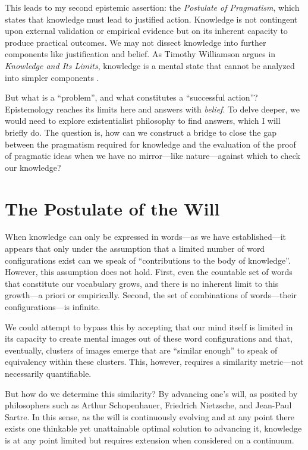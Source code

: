 This leads to my second epistemic assertion: the \textit{Postulate of Pragmatism}, which states that knowledge must lead to justified action. Knowledge is not contingent upon external validation or empirical evidence but on its inherent capacity to produce practical outcomes. We may not dissect knowledge into further components like justification and belief. As Timothy Williamson argues in \textit{Knowledge and Its Limits}, knowledge is a mental state that cannot be analyzed into simpler components \parencite{williamson2002knowledge}.

But what is a \enquote{problem}, and what constitutes a \enquote{successful action}? Epistemology reaches its limits here and answers with \textit{belief}. To delve deeper, we would need to explore existentialist philosophy to find answers, which I will briefly do. The question is, how can we construct a bridge to close the gap between the pragmatism required for knowledge and the evaluation of the proof of pragmatic ideas when we have no mirror—like nature—against which to check our knowledge?

\section*{The Postulate of the Will}

When knowledge can only be expressed in words—as we have established—it appears that only under the assumption that a limited number of word configurations exist can we speak of \enquote{contributions to the body of knowledge}. However, this assumption does not hold. First, even the countable set of words that constitute our vocabulary grows, and there is no inherent limit to this growth—a priori or empirically. Second, the set of combinations of words—their configurations—is infinite.

We could attempt to bypass this by accepting that our mind itself is limited in its capacity to create mental images out of these word configurations and that, eventually, clusters of images emerge that are \enquote{similar enough} to speak of equivalency within these clusters. This, however, requires a similarity metric—not necessarily quantifiable.

But how do we determine this similarity? By advancing one's will, as posited by philosophers such as Arthur Schopenhauer, Friedrich Nietzsche, and Jean-Paul Sartre. In this sense, as the will is continuously evolving and at any point there exists one thinkable yet unattainable optimal solution to advancing it, knowledge is at any point limited but requires extension when considered on a continuum.

